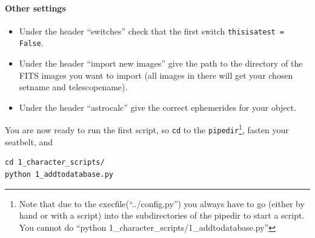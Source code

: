 \paragraph{Other settings}

\begin{itemize}
 \item Under the header ``switches'' check that the first switch \verb+thisisatest = False+. 
\item Under the header ``import new images'' give the path to the directory of the FITS images you want to import (all images in there will get your chosen setname and telescopename).
\item Under the header ``astrocalc'' give the correct ephemerides for your object.
\end{itemize}


You are now ready to run the first script, so
\verb+cd+ to the \verb+pipedir+\footnote{Note that due to the execfile(``../config.py'') you always have to go (either by hand or with a script) into the subdirectories of the pipedir to start a script. You cannot do ``python 1\_character\_scripts/1\_addtodatabase.py''}, fasten your seatbelt, and

\begin{Verbatim}
cd 1_character_scripts/
python 1_addtodatabase.py
\end{Verbatim}


